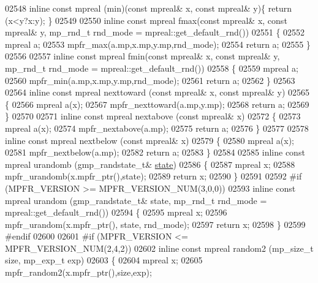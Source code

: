 \begin{DoxyCode}
{{02548 \textcolor{keyword}{inline} \textcolor{keyword}{const} mpreal (min)(\textcolor{keyword}{const} mpreal& x, \textcolor{keyword}{const} mpreal& y)\{    \textcolor{keywordflow}{return} (x<y?x:y);       \}
02549 
02550 \textcolor{keyword}{inline} \textcolor{keyword}{const} mpreal fmax(\textcolor{keyword}{const} mpreal& x, \textcolor{keyword}{const} mpreal& y, mp\_rnd\_t rnd\_mode = mpreal::get\_default\_rnd())
02551 \{
02552     mpreal a;
02553     mpfr\_max(a.mp,x.mp,y.mp,rnd\_mode);
02554     \textcolor{keywordflow}{return} a;
02555 \}
02556 
02557 \textcolor{keyword}{inline} \textcolor{keyword}{const} mpreal fmin(\textcolor{keyword}{const} mpreal& x, \textcolor{keyword}{const} mpreal& y,  mp\_rnd\_t rnd\_mode = mpreal::get\_default\_rnd())
02558 \{
02559     mpreal a;
02560     mpfr\_min(a.mp,x.mp,y.mp,rnd\_mode);
02561     \textcolor{keywordflow}{return} a;
02562 \}
02563 
02564 \textcolor{keyword}{inline} \textcolor{keyword}{const} mpreal nexttoward (\textcolor{keyword}{const} mpreal& x, \textcolor{keyword}{const} mpreal& y)
02565 \{
02566     mpreal a(x);
02567     mpfr\_nexttoward(a.mp,y.mp);
02568     \textcolor{keywordflow}{return} a;
02569 \}
02570 
02571 \textcolor{keyword}{inline} \textcolor{keyword}{const} mpreal nextabove  (\textcolor{keyword}{const} mpreal& x)
02572 \{
02573     mpreal a(x);
02574     mpfr\_nextabove(a.mp);
02575     \textcolor{keywordflow}{return} a;
02576 \}
02577 
02578 \textcolor{keyword}{inline} \textcolor{keyword}{const} mpreal nextbelow  (\textcolor{keyword}{const} mpreal& x)
02579 \{
02580     mpreal a(x);
02581     mpfr\_nextbelow(a.mp);
02582     \textcolor{keywordflow}{return} a;
02583 \}
02584 
02585 \textcolor{keyword}{inline} \textcolor{keyword}{const} mpreal urandomb (gmp\_randstate\_t& \hyperlink{structstate}{state})
02586 \{
02587     mpreal x;
02588     mpfr\_urandomb(x.mpfr\_ptr(),state);
02589     \textcolor{keywordflow}{return} x;
02590 \}
02591 
02592 \textcolor{preprocessor}{#if (MPFR\_VERSION >= MPFR\_VERSION\_NUM(3,0,0))}
02593 \textcolor{keyword}{inline} \textcolor{keyword}{const} mpreal urandom (gmp\_randstate\_t& state, mp\_rnd\_t rnd\_mode = mpreal::get\_default\_rnd())
02594 \{
02595     mpreal x;
02596     mpfr\_urandom(x.mpfr\_ptr(), state, rnd\_mode);
02597     \textcolor{keywordflow}{return} x;
02598 \}
02599 \textcolor{preprocessor}{#endif}
02600 
02601 \textcolor{preprocessor}{#if (MPFR\_VERSION <= MPFR\_VERSION\_NUM(2,4,2))}
02602 \textcolor{keyword}{inline} \textcolor{keyword}{const} mpreal random2 (mp\_size\_t size, mp\_exp\_t exp)
02603 \{
02604     mpreal x;
02605     mpfr\_random2(x.mpfr\_ptr(),size,exp);
}}
\end{DoxyCode}
